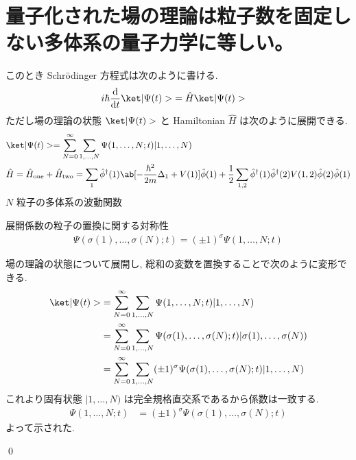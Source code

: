 \documentclass[uplatex,dvipdfmx,a4paper,11pt]{jlreq}
\makeatletter
\numberwithin{equation}{section}
\theoremstyle{definition}
\renewenvironment{proof}[1][\proofname]{\par
  \normalfont
  \topsep6\p@\@plus6\p@ \trivlist
  \item[\hskip\labelsep{\bfseries #1}\@addpunct{\bfseries}]\ignorespaces\quad\par
}{
  \qed\endtrivlist\@endpefalse
}
\renewcommand\proofname{証明}
\makeatother
\begin{document}
\section{量子化された場の理論は粒子数を固定しない多体系の量子力学に等しい。}
\begin{definition}[場の理論]
  このとき Schrödinger 方程式は次のように書ける.
  \begin{align}
    i\hbar\diff{}{t}\ket|\Psi(t)> & = \hat{H}\ket|\Psi(t)>
  \end{align}
  ただし場の理論の状態 $\ket|\Psi(t)>$ と Hamiltonian $\hat{H}$ は次のように展開できる.
  \begin{align}
     & \ket|\Psi(t)> = \sum_{N=0}^{\infty}\sum_{1,\ldots,N}\Psi(1,\ldots,N; t)|1,\ldots,N)                                                                                                                                                                \\
     & \hat{H} = \hat{H}_{\mathrm{one}} + \hat{H}_{\mathrm{two}} = \sum_{1}\hat{\phi}^\dagger(1)\ab[-\frac{\hbar^2}{2m}\Delta_{1} + V(1)]\hat{\phi}(1) + \frac{1}{2}\sum_{1,2}\hat{\phi}^\dagger(1)\hat{\phi}^\dagger(2)V(1, 2)\hat{\phi}(2)\hat{\phi}(1)
  \end{align}
  $N$ 粒子の多体系の波動関数
\end{definition}
\begin{theorem}[Q21-93]
  展開係数の粒子の置換に関する対称性
  \begin{align}
    \Psi(\sigma(1),\ldots,\sigma(N);t) = (\pm 1)^\sigma\Psi(1,\ldots,N; t)
  \end{align}
\end{theorem}
\begin{proof}
  場の理論の状態について展開し, 総和の変数を置換することで次のように変形できる.
  \begin{align}
    \ket|\Psi(t)> & = \sum_{N=0}^{\infty}\sum_{1,\ldots,N}\Psi(1,\ldots,N; t)|1,\ldots,N)                                 \\
                  & = \sum_{N=0}^{\infty}\sum_{1,\ldots,N}\Psi(\sigma(1),\ldots,\sigma(N); t)|\sigma(1),\ldots,\sigma(N)) \\
                  & = \sum_{N=0}^{\infty}\sum_{1,\ldots,N}(\pm 1)^\sigma\Psi(\sigma(1),\ldots,\sigma(N); t)|1,\ldots,N)
  \end{align}
  これより固有状態 $|1,\ldots,N)$ は完全規格直交系であるから係数は一致する.
  \begin{align}
    \Psi(1,\ldots,N; t) & = (\pm 1)^\sigma\Psi(\sigma(1),\ldots,\sigma(N);t)
  \end{align}
  よって示された.
\end{proof}
\end{document}

